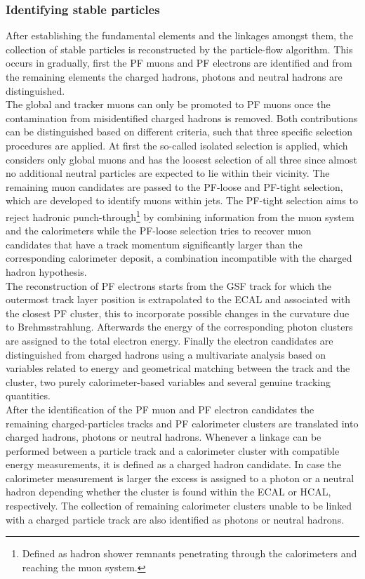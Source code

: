 \subsubsection*{Identifying stable particles}
After establishing the fundamental elements and the linkages amongst them, the collection of stable particles is reconstructed by the particle-flow algorithm. This occurs in gradually, first the PF muons and PF electrons are identified and from the remaining elements the charged hadrons, photons and neutral hadrons are distinguished.
\\
The global and tracker muons can only be promoted to PF muons once the contamination from misidentified charged hadrons is removed.
Both contributions can be distinguished based on different criteria, such that three specific selection procedures are applied.
At first the so-called isolated selection is applied, which considers only global muons and has the loosest selection of all three since almost no additional neutral particles are expected to lie within their vicinity. 
The remaining muon candidates are passed to the PF-loose and PF-tight selection, which are developed to identify muons within jets. The PF-tight selection aims to reject hadronic punch-through\footnote{Defined as hadron shower remnants penetrating through the calorimeters and reaching the muon system.} by combining information from the muon system and the calorimeters while the PF-loose selection tries to recover muon candidates that have a track momentum significantly larger than the corresponding calorimeter deposit, a combination incompatible with the charged hadron hypothesis.
\\
The reconstruction of PF electrons starts from the GSF track for which the outermost track layer position is extrapolated to the ECAL and associated with the closest PF cluster, this to incorporate possible changes in the curvature due to Brehmsstrahlung.
Afterwards the energy of the corresponding photon clusters are assigned to the total electron energy. Finally the electron candidates are distinguished from charged hadrons using a multivariate analysis based on variables related to energy and geometrical matching between the track and the cluster, two purely calorimeter-based variables and several genuine tracking quantities.
\\

After the identification of the PF muon and PF electron candidates the remaining charged-particles tracks and PF calorimeter clusters are translated into charged hadrons, photons or neutral hadrons.
Whenever a linkage can be performed between a particle track and a calorimeter cluster with compatible energy measurements, it is defined as a charged hadron candidate. In case the calorimeter measurement is larger the excess is assigned to a photon or a neutral hadron depending whether the cluster is found within the ECAL or HCAL, respectively.
The collection of remaining calorimeter clusters unable to be linked with a charged particle track are also identified as photons or neutral hadrons.

